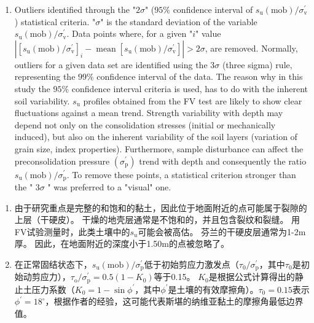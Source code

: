 \begin{ParaColumn}
\begin{enumerate}
        \item Outliers identified through the "$2\sigma$" ($95\%$ confidence interval of $s_{\mathrm{u}}(\mathrm{mob}) / \sigma_{\mathrm{v}}^{\prime}$) statistical criteria. "$\sigma$" is the standard deviation of the variable $s_{\mathrm{u}}(\mathrm{mob})/\sigma_{\mathrm{v}}^{\prime}$. Data points where, for a given "$i$" value $\left|\left[s_{\mathrm{u}}(\mathrm{mob}) / \sigma_{\mathrm{v}}^{\prime}\right]_{i}-\operatorname{mean}\left[s_{\mathrm{u}}(\mathrm{mob}) / \sigma_{\mathrm{v}}^{\prime}\right]\right|>2\sigma$, are removed. Normally, outliers for a given data set are identified using the $3 \sigma$ (three sigma) rule, representing the $99\%$ confidence interval of the data. The reason why in this study the $95 \%$ confidence interval criteria is used, has to do with the inherent soil variability. $s_{\mathrm{u}}$ profiles obtained from the FV test are likely to show clear fluctuations against a mean trend. Strength variability with depth may depend not only on the consolidation stresses (initial or mechanically induced), but also on the inherent variability of the soil layers (variation of grain size, index properties). Furthermore, sample disturbance can affect the preconsolidation pressure $\left(\sigma_{\mathrm{p}}^{\prime}\right)$ trend with depth and consequently the ratio $s_{\mathrm{u}}(\mathrm{mob})/\sigma_{\mathrm{p}}^{\prime} .$ To remove these points, a statistical criterion stronger than the " $3 \sigma$ " was preferred to a "visual" one.
    \end{enumerate}

    \switchcolumn

    \begin{enumerate}
        \item 由于研究重点是完整的和饱和的黏土，因此位于地面附近的点可能属于裂隙的上层（干硬皮）。 干燥的地壳层通常是不饱和的，并且包含裂纹和裂缝。 用FV试验测量时，此类土壤中的$s_u$可能会被高估\citep{LaRochelle1974142,Lefebvre198723,D'Ignazio20153639}。 芬兰的干硬皮层通常为1-2m厚。 因此，在地面附近的深度小于1.50m的点被忽略了。
        
        \item 在正常固结状态下，$s_{\mathrm{u}}(\mathrm{mob})/\sigma_{\mathrm{p}}^{\prime}$低于初始剪应力激发点（$\tau_{0}/\sigma_{\mathrm{p}}^{\prime}$，其中$\tau_{0}$是初始动剪应力），$\tau_{\mathrm{o}} / \sigma_{\mathrm{p}}^{\prime}=0.5\left(1-K_{0}\right)$等于0.15。 $K_0$是根据\citet{Jaky1944355}公式计算得出的静止土压力系数（$K_{0}=1-\sin \phi^{\prime}$，其中$\phi^{\prime}$是土壤的有效摩擦角）。$\tau_{0}=0.15$表示$\phi^{\prime}=18^{\circ}$，根据作者的经验，这可能代表斯堪的纳维亚黏土的摩擦角最低边界值。
        

\end{enumerate}
\end{ParaColumn}
